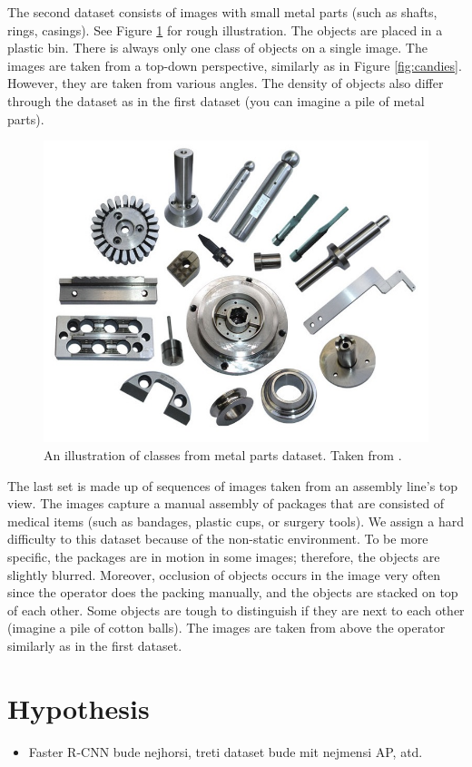  The second dataset consists of images with small metal parts (such as shafts, rings, casings). See Figure \ref{fig:parts} for rough illustration. The objects are placed in a plastic bin. There is always only one class of objects on a single image. The images are taken from a top-down perspective, similarly as in Figure \ref{fig:candies}. However, they are taken from various angles. The density of objects also differ through the dataset as in the first dataset (you can imagine a pile of metal parts).

\begin{figure}[ht]
	\centering
	\includegraphics[height=0.35\linewidth]{Sources/Figures/metal_parts.jpg}
	\caption{An illustration of classes from metal parts dataset. Taken from \cite{parts}.} 
	\label{fig:parts}
\end{figure}

 The last set is made up of sequences of images taken from an assembly line's top view. The images capture a manual assembly of packages that are consisted of medical items (such as bandages, plastic cups, or surgery tools). We assign a hard difficulty to this dataset because of the non-static environment. To be more specific, the packages are in motion in some images; therefore, the objects are slightly blurred. Moreover, occlusion of objects occurs in the image very often since the operator does the packing manually, and the objects are stacked on top of each other. Some objects are tough to distinguish if they are next to each other (imagine a pile of cotton balls). The images are taken from above the operator similarly as in the first dataset.

\section{Hypothesis}
\begin{itemize}
    \item Faster R-CNN bude nejhorsi, treti dataset bude mit nejmensi AP, atd.
\end{itemize}
